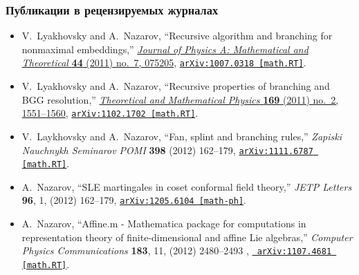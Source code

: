 \documentclass[pdftex]{beamer}
\theoremstyle{definition} \newtheorem{Def}{Определение}
\begin{document}
\begin{frame}
  \frametitle{Публикации в рецензируемых журналах}
  \begin{itemize}
  \item
    V.~{Lyakhovsky} and A.~{Nazarov}, ``{Recursive algorithm and branching for
      nonmaximal embeddings},''
    \href{http://dx.doi.org/10.1088/1751-8113/44/7/075205}{{\em Journal of
        Physics A: Mathematical and Theoretical} {\bf 44} (2011) no.~7, 075205},
    \href{http://arxiv.org/abs/1007.0318}{{\tt arXiv:1007.0318 [math.RT]}}.

  \item
    V.~{Lyakhovsky} and A.~{Nazarov}, ``{Recursive properties of branching and BGG
      resolution},'' \href{http://dx.doi.org/10.1007/s11232-011-0132-9}{{\em
        Theoretical and Mathematical Physics} {\bf 169} (2011) no.~2, 1551--1560},
    \href{http://arxiv.org/abs/1102.1702}{{\tt arXiv:1102.1702 [math.RT]}}.

  \item
    V.~{Laykhovsky} and A.~{Nazarov}, ``{Fan, splint and branching rules},'' {\em
      Zapiski Nauchnykh Seminarov POMI} {\bf 398} (2012)  162--179,
    \href{http://arxiv.org/abs/1111.6787}{{\tt arXiv:1111.6787 [math.RT]}}.

  \item
    A.~{Nazarov}, ``{SLE martingales in coset conformal field theory},''  {\em
      JETP Letters} {\bf 96}, 1,  (2012)  162--179,
    \href{http://arxiv.org/abs/1205.6104}{{\tt arXiv:1205.6104 [math-ph]}}.

  \item
    A.~{Nazarov}, ``{Affine.m - Mathematica package for computations in
      representation theory of finite-dimensional and affine Lie algebras},'' {\em
    Computer Physics Communications} {\bf 183}, 11, (2012)  2480--2493 , \href{http://arxiv.org/abs/1107.4681}{{\tt
        arXiv:1107.4681 [math.RT]}}.

  \end{itemize}
\end{frame}
\end{document}
